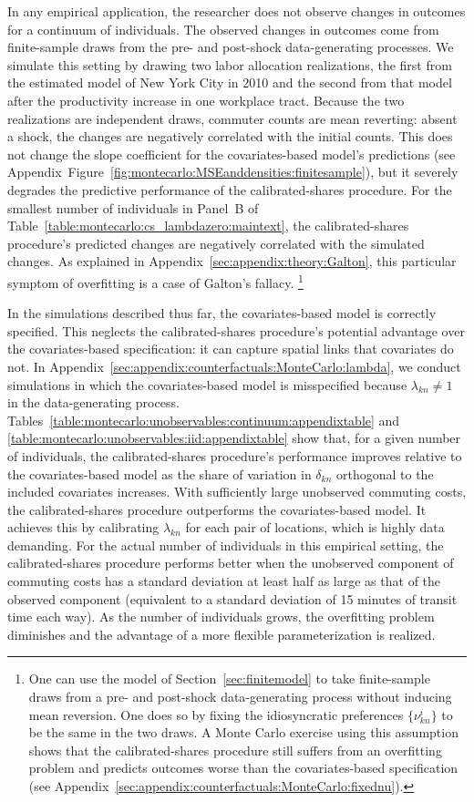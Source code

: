 \documentclass[11pt]{article}
\theoremstyle{definition}
\newcommand\idiosyncraticphrase{idiosyncratic preference}
\begin{document}
In any empirical application,
the researcher does not observe changes in outcomes for a continuum of individuals.
The observed changes in outcomes come from finite-sample draws from the pre- and post-shock data-generating processes.
We simulate this setting by drawing two labor allocation realizations,
the first from the estimated model of New York City in 2010 
and
the second from that model after the productivity increase in one workplace tract.
Because the two realizations are independent draws,
commuter counts are mean reverting:
absent a shock, 
the changes are negatively correlated with the initial counts.
This does not change the slope coefficient for the covariates-based model's predictions (see Appendix~Figure~\ref{fig:montecarlo:MSEanddensities:finitesample}),
but it severely degrades the predictive performance of the calibrated-shares procedure.
For the smallest number of individuals in Panel~B of Table~\ref{table:montecarlo:cs_lambdazero:maintext},
the calibrated-shares procedure's predicted changes are negatively correlated with the simulated changes.
As explained in Appendix~\ref{sec:appendix:theory:Galton},
this particular symptom of overfitting is a case of Galton's fallacy.%
\footnote{
	One can use the model of Section~\ref{sec:finitemodel} 
	to take finite-sample draws from a pre- and post-shock data-generating process 
	without inducing mean reversion.
	One does so by fixing the \idiosyncraticphrase s $\{\nu^{i}_{kn}\}$ to be the same in the two draws.
	A Monte Carlo exercise using this assumption shows that
	the calibrated-shares procedure still suffers from an overfitting problem and predicts outcomes worse 
	than the covariates-based specification
	(see Appendix~\ref{sec:appendix:counterfactuals:MonteCarlo:fixednu}).
}

In the simulations described thus far, the covariates-based model is correctly specified.
This neglects the calibrated-shares procedure's potential advantage over the covariates-based specification:
it can capture spatial links that covariates do not.
In Appendix~\ref{sec:appendix:counterfactuals:MonteCarlo:lambda}, we conduct simulations
in which the covariates-based model is misspecified because $\lambda_{kn} \neq 1$ in the data-generating process.
Tables~\ref{table:montecarlo:unobservables:continuum:appendixtable}
and \ref{table:montecarlo:unobservables:iid:appendixtable}
show that,
for a given number of individuals,
the calibrated-shares procedure's performance improves relative to the covariates-based model 
as the share of variation in $\delta_{kn}$ orthogonal to the included covariates increases.
With sufficiently large unobserved commuting costs, the calibrated-shares procedure outperforms the covariates-based model.
It achieves this by calibrating $\lambda_{kn}$ for each pair of locations,
which is highly data demanding.
For the actual number of individuals in this empirical setting,
the calibrated-shares procedure performs better 
when the unobserved component of commuting costs has a standard deviation 
at least half as large as that of the observed component
(equivalent to a standard deviation of 15 minutes of transit time each way).
As the number of individuals grows,
the overfitting problem diminishes and the advantage of a more flexible parameterization is realized.
\end{document}

